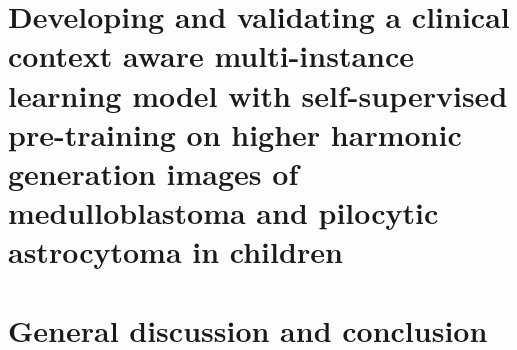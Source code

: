 \documentclass[
	fontsize=10pt, %
	twoside=false, %
	secnumdepth=2, %
	numbers=noenddot,
]{kaobook}
\begin{document}

\clearpage








\chapter[SCLICOM]{Developing and validating a clinical context aware multi-instance learning model with self-supervised pre-training on higher harmonic generation images of medulloblastoma and pilocytic astrocytoma in children}\label{ch:sclicom}



\clearpage








\chapter[General discussion and conclusion]{General discussion and conclusion}\label{ch:general_discussion_and_conclusion}


\clearpage
{}


\printbibheading[title=References, heading=bibintoc]
\printbibliography[heading=none] %
\end{document}
